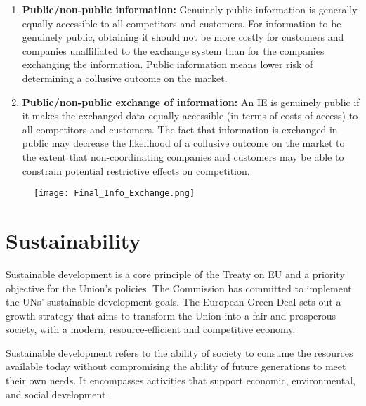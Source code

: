 \begin{enumerate}
            \item \textbf{Public/non-public information:} Genuinely public information is generally equally accessible to all competitors and customers. For information to be genuinely public, obtaining it should not be more costly for customers and companies unaffiliated to the exchange system than for the companies exchanging the information. Public information means lower risk of determining a collusive outcome on the market.
            
            \item \textbf{Public/non-public exchange of information:} An IE is genuinely public if it makes the exchanged data equally accessible (in terms of costs of access) to all competitors and customers. The fact that information is exchanged in public may decrease the likelihood of a collusive outcome on the market to the extent that non-coordinating companies and customers may be able to constrain potential restrictive effects on competition.
        \end{enumerate}

\newpage

    \begin{figure}[h!]
        \centering
        \texttt{[image: Final\_Info\_Exchange.png]}
    \end{figure}

\newpage

\section{Sustainability}

    Sustainable development is a core principle of the Treaty on EU and a priority objective for the Union’s policies. The Commission has committed to implement the UNs’ sustainable development goals. The European Green Deal sets out a growth strategy that aims to transform the Union into a fair and prosperous society, with a modern, resource-efficient and competitive economy.

    Sustainable development refers to the ability of society to consume the resources available today without compromising the ability of future generations to meet their own needs. It encompasses activities that support economic, environmental, and social development.

